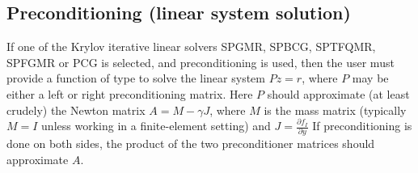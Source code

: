 \documentclass[letterpaper,10pt,english]{sphinxmanual}
\begin{document}
\subsection{Preconditioning (linear system solution)}
\label{c_interface/User_supplied:cinterface-precsolvefn}\label{c_interface/User_supplied:preconditioning-linear-system-solution}
If one of the Krylov iterative linear solvers SPGMR, SPBCG, SPTFQMR,
SPFGMR or PCG is selected, and preconditioning is used, then the user
must provide a function of type {\hyperref[c_interface/User_supplied:c.ARKSpilsPrecSolveFn]{\emph{}}} to
solve the linear system \(Pz=r\), where \(P\) may be either a
left or right preconditioning matrix.  Here \(P\) should
approximate (at least crudely) the Newton matrix \(A=M-\gamma J\),
where \(M\) is the mass matrix (typically \(M=I\) unless
working in a finite-element setting) and \(J = \frac{\partial
f_I}{\partial y}\)  If preconditioning is done on both sides, the
product of the two preconditioner matrices should approximate
\(A\).
\end{document}
